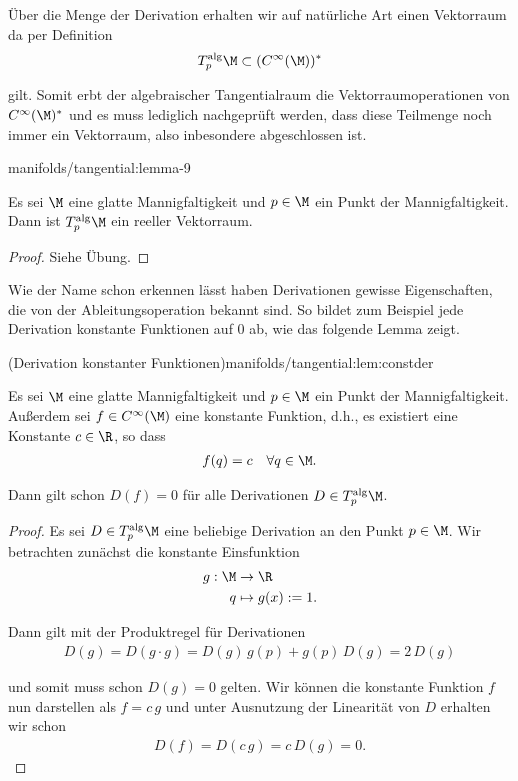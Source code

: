 \documentclass[letterpaper,10pt,german]{jupyterBook}
\begin{document}
\par
Über die Menge der Derivation erhalten wir auf natürliche Art einen Vektorraum da per Definition
\begin{align*}
T^{\text{alg}}_p\M \subset (C^\infty(\M))^\ast
\end{align*}
\par
gilt.
Somit erbt der algebraischer Tangentialraum die Vektorraumoperationen von \(C^\infty(\M)^\ast\) und es muss lediglich nachgeprüft werden, dass diese Teilmenge noch immer ein Vektorraum, also inbesondere abgeschlossen ist.
\begin{lemma}{}{manifolds/tangential:lemma-9}



\par
Es sei \(\M\) eine glatte Mannigfaltigkeit und \(p\in\M\) ein Punkt der Mannigfaltigkeit.
Dann ist \(T^{\text{alg}}_p\M\) ein reeller Vektorraum.
\end{lemma}

\begin{proof}
 Siehe Übung.
\end{proof}

\par
Wie der Name schon erkennen lässt haben Derivationen gewisse Eigenschaften, die von der Ableitungsoperation bekannt sind.
So bildet zum Beispiel jede Derivation konstante Funktionen auf \(0\) ab, wie das folgende Lemma zeigt.
\begin{lemma}{(Derivation konstanter Funktionen)}{manifolds/tangential:lem:constder}



\par
Es sei \(\M\) eine glatte Mannigfaltigkeit und \(p\in\M\) ein Punkt der Mannigfaltigkeit.
Außerdem sei \(f\in C^\infty(\M)\) eine konstante Funktion, d.h., es existiert eine Konstante \(c\in\R\), so dass
\begin{align*}
f(q) = c\quad\forall q\in\M.
\end{align*}
\par
Dann gilt schon \(D(f)=0\) für alle Derivationen \(D\in T^{\text{alg}}_p\M\).
\end{lemma}

\begin{proof}
 Es sei \(D\in T^{\text{alg}}_p\M\) eine beliebige Derivation an den Punkt \(p \in \M\).
Wir betrachten zunächst die konstante Einsfunktion
\begin{align*}
g:\M &\to \R\\
q &\mapsto g(x) := 1.
\end{align*}
\par
Dann gilt mit der Produktregel für Derivationen
\begin{align*}
D(g) = D(g\cdot g) = D(g)\,g(p) + g(p)\, D(g) = 2\,D(g)
\end{align*}
\par
und somit muss schon \(D(g) = 0\) gelten.
Wir können die konstante Funktion \(f\) nun darstellen als \(f= c\,g\) und unter Ausnutzung der Linearität von \(D\) erhalten wir schon
\begin{align*}
D(f) = D(c\,g) = c\,D(g) = 0.
\end{align*}\end{proof}
\end{document}
